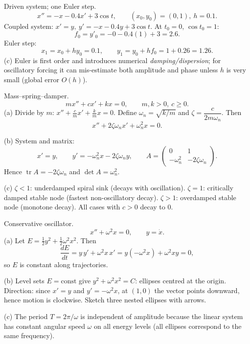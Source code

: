 \documentclass[11pt]{article}
\def\textbf#1{#1}%
\begin{document}
\begin{solution}
\textbf{Driven system; one Euler step.}
\[
x''=-x-0.4x'+3\cos t,\qquad (x_0,y_0)=(0,1),\ h=0.1.
\]
Coupled system: \(x'=y,\ y'=-x-0.4y+3\cos t\).
At \(t_0=0\), \(\cos t_0=1\):
\[
f_0=y'_0=-0-0.4(1)+3=2.6.
\]
Euler step:
\[
\boxed{x_1=x_0+h y_0=0.1},\qquad \boxed{y_1=y_0+h f_0=1+0.26=1.26}.
\]
(c) Euler is first order and introduces numerical \emph{damping/dispersion}; for oscillatory forcing it can mis-estimate both amplitude and phase unless \(h\) is very small (global error \(O(h)\)).
\end{solution}

\begin{solution}
\textbf{Mass–spring–damper.}
\[
m x''+c x'+k x=0,\qquad m,k>0,\ c\ge0.
\]
(a) Divide by \(m\): \(x''+\tfrac{c}{m}x'+\tfrac{k}{m}x=0\).
Define \(\omega_n=\sqrt{k/m}\) and \(\zeta=\dfrac{c}{2m\omega_n}\). Then
\[
\boxed{x''+2\zeta\omega_n x'+\omega_n^2 x=0}.
\]

(b) System and matrix:
\[
x'=y,\qquad y'=-\omega_n^2 x-2\zeta\omega_n y,\qquad
A=\begin{pmatrix}0&1\\-\omega_n^2&-2\zeta\omega_n\end{pmatrix}.
\]
Hence \(\operatorname{tr}A=-2\zeta\omega_n\) and \(\det A=\omega_n^2\).

(c) \(\zeta<1\): \textbf{underdamped spiral sink} (decays with oscillation).  
\(\zeta=1\): \textbf{critically damped} stable node (fastest non-oscillatory decay).  
\(\zeta>1\): \textbf{overdamped} stable node (monotone decay). All cases with \(c>0\) decay to \(0\).
\end{solution}

\begin{solution}
\textbf{Conservative oscillator.}
\[
x''+\omega^{2}x=0,\qquad y=\dot x.
\]
(a) Let \(E=\tfrac12 y^{2}+\tfrac12\omega^{2}x^{2}\). Then
\[
\frac{dE}{dt}=y\,y'+\omega^{2}x\,x'=y(-\omega^{2}x)+\omega^{2}x y=0,
\]
so \(E\) is constant along trajectories.

(b) Level sets \(E=\text{const}\) give \(y^{2}+\omega^{2}x^{2}=C\): \textbf{ellipses} centred at the origin.  
Direction: since \(x'=y\) and \(y'=-\omega^{2}x\), at \((1,0)\) the vector points downward, hence motion is \textbf{clockwise}. Sketch three nested ellipses with arrows.

(c) The period \(T=2\pi/\omega\) is independent of amplitude because the linear system has constant angular speed \(\omega\) on all energy levels (all ellipses correspond to the same frequency).
\end{solution}
\end{document}
